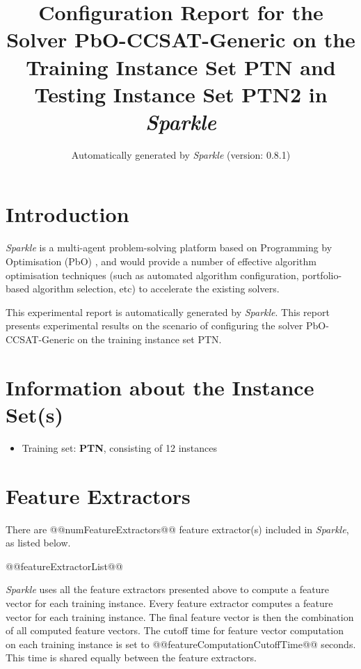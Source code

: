 \documentclass[british]{article}
\title{Configuration Report for the Solver PbO-CCSAT-Generic on the Training Instance Set PTN \iftest and Testing Instance Set PTN2 \fi in \emph{Sparkle} }
\author{ Automatically generated by \emph{Sparkle} (version: 0.8.1) }
\newif\iftest
\newif\iffeatures
\begin{document}
\maketitle %


\section{Introduction}
\label{sec:Introduction}

\emph{Sparkle} \cite{Hoos15} is a multi-agent problem-solving platform based on Programming by Optimisation (PbO) \cite{Hoos12}, and would provide a number of effective algorithm optimisation techniques (such as automated algorithm configuration, portfolio-based algorithm selection, etc) to accelerate the existing solvers.

This experimental report is automatically generated by \emph{Sparkle}. This report presents experimental results on the scenario of configuring the solver PbO-CCSAT-Generic on the training instance set PTN\iftest~and evaluating it on the testing instance set PTN2\fi.


\section{Information about the Instance Set(s)}

\begin{itemize}
\item Training set: \textbf{PTN}, consisting of 12 instances
\iftest\item Testing set: \textbf{PTN2}, consisting of 11 instances\fi
\end{itemize}


\iffeatures
    \section{Feature Extractors}
        There are @@numFeatureExtractors@@ feature extractor(s) included in \emph{Sparkle}, as listed below.

        \begin{enumerate}
        @@featureExtractorList@@
        \end{enumerate}

        \emph{Sparkle} uses all the feature extractors presented above to compute a feature vector for each training instance. Every feature extractor computes a feature vector for each training instance. The final feature vector is then the combination of all computed feature vectors. The cutoff time for feature vector computation on each training instance is set to @@featureComputationCutoffTime@@ seconds. This time is shared equally between the feature extractors.
\end{document}
